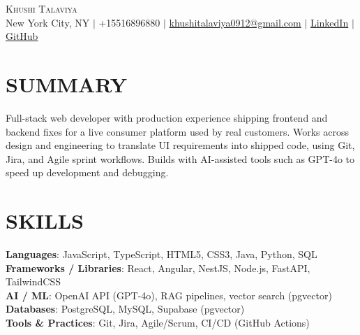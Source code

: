 \documentclass[letterpaper,11pt]{article}
\begin{document}
\begin{center}
    {\Huge \scshape Khushi Talaviya} \\ \vspace{2pt}
    \vspace{4pt}
    \small
    New York City, NY $|$
    \small
    +15516896880 $|$
    \href{mailto:khushitalaviya0912@gmail.com}{khushitalaviya0912@gmail.com} $|$
    \href{https://www.linkedin.com/in/khushitalaviya/}{LinkedIn} $|$
    \href{https://github.com/talaviyakhushi}{GitHub}
\end{center}

\section{SUMMARY}
\vspace{5pt}
\small{Full-stack web developer with production experience shipping frontend and backend fixes for a live consumer platform used by real customers. Works across design and engineering to translate UI requirements into shipped code, using Git, Jira, and Agile sprint workflows. Builds with AI-assisted tools such as GPT-4o to speed up development and debugging.}

\vspace{2pt}
\section{SKILLS}
\vspace{5pt}
\begin{itemize}[leftmargin=0in, label={}]
\small{\item{
\textbf{Languages}{: JavaScript, TypeScript, HTML5, CSS3, Java, Python, SQL} \\
\textbf{Frameworks / Libraries}{: React, Angular, NestJS, Node.js, FastAPI, TailwindCSS} \\
\textbf{AI / ML}{: OpenAI API (GPT-4o), RAG pipelines, vector search (pgvector)} \\
\textbf{Databases}{: PostgreSQL, MySQL, Supabase (pgvector)} \\
\textbf{Tools \& Practices}{: Git, Jira, Agile/Scrum, CI/CD (GitHub Actions)}
}}
\end{itemize}
\vspace{-10pt}

\end{document}
